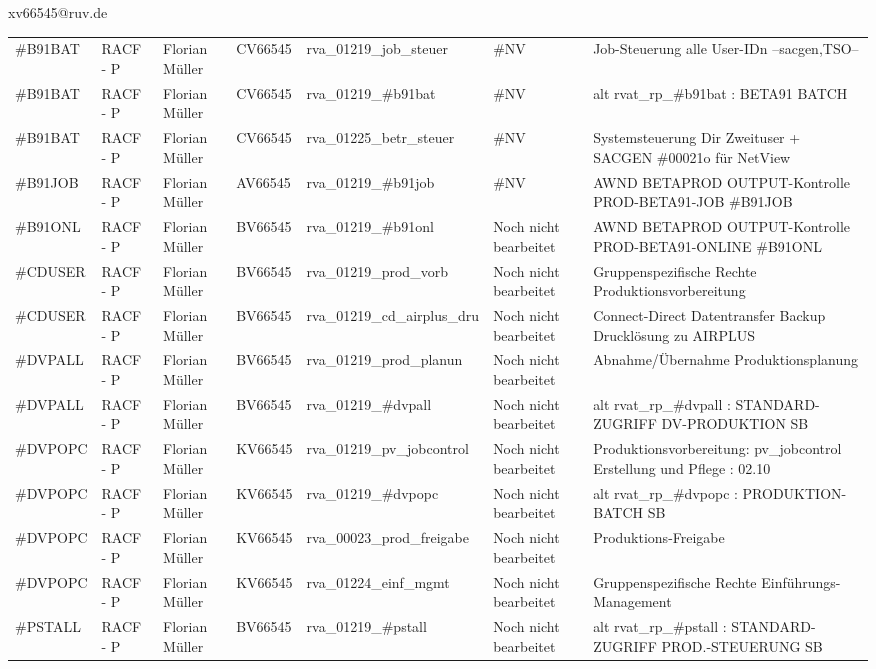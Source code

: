\documentclass[a4paper,landscape,12pt]{letter}
\begin{document}
\begin{letter}{xv66545@ruv.de\hfill \break}
\begin{tiny}
\begin{longtable}{|p{35mm}|p{15mm}|p{25mm}|p{10mm}|p{40mm}|p{50mm}|p{50mm}|}
\#B91BAT & RACF - P & Florian Müller & CV66545 & rva\_01219\_job\_steuer & \#NV & Job-Steuerung alle User-IDn --sacgen,TSO-- \\
\#B91BAT & RACF - P & Florian Müller & CV66545 & rva\_01219\_\#b91bat & \#NV & alt rvat\_rp\_\#b91bat          : BETA91 BATCH \\
\#B91BAT & RACF - P & Florian Müller & CV66545 & rva\_01225\_betr\_steuer & \#NV & Systemsteuerung Dir Zweituser + SACGEN \#00021o für NetView \\
\#B91JOB & RACF - P & Florian Müller & AV66545 & rva\_01219\_\#b91job & \#NV & AWND BETAPROD OUTPUT-Kontrolle PROD-BETA91-JOB \#B91JOB \\
\#B91ONL & RACF - P & Florian Müller & BV66545 & rva\_01219\_\#b91onl & Noch nicht bearbeitet & AWND BETAPROD OUTPUT-Kontrolle PROD-BETA91-ONLINE \#B91ONL \\
\#CDUSER & RACF - P & Florian Müller & BV66545 & rva\_01219\_prod\_vorb & Noch nicht bearbeitet & Gruppenspezifische Rechte Produktionsvorbereitung \\
\#CDUSER & RACF - P & Florian Müller & BV66545 & rva\_01219\_cd\_airplus\_dru & Noch nicht bearbeitet & Connect-Direct Datentransfer Backup Drucklösung zu AIRPLUS \\
\#DVPALL & RACF - P & Florian Müller & BV66545 & rva\_01219\_prod\_planun & Noch nicht bearbeitet & Abnahme/Übernahme Produktionsplanung \\
\#DVPALL & RACF - P & Florian Müller & BV66545 & rva\_01219\_\#dvpall & Noch nicht bearbeitet & alt rvat\_rp\_\#dvpall          : STANDARD-ZUGRIFF DV-PRODUKTION SB \\
\#DVPOPC & RACF - P & Florian Müller & KV66545 & rva\_01219\_pv\_jobcontrol & Noch nicht bearbeitet & Produktionsvorbereitung: pv\_jobcontrol Erstellung und Pflege : 02.10 \\
\#DVPOPC & RACF - P & Florian Müller & KV66545 & rva\_01219\_\#dvpopc & Noch nicht bearbeitet & alt rvat\_rp\_\#dvpopc          : PRODUKTION-BATCH SB \\
\#DVPOPC & RACF - P & Florian Müller & KV66545 & rva\_00023\_prod\_freigabe & Noch nicht bearbeitet & Produktions-Freigabe \\
\#DVPOPC & RACF - P & Florian Müller & KV66545 & rva\_01224\_einf\_mgmt & Noch nicht bearbeitet & Gruppenspezifische Rechte Einführungs-Management \\
\#PSTALL & RACF - P & Florian Müller & BV66545 & rva\_01219\_\#pstall & Noch nicht bearbeitet & alt rvat\_rp\_\#pstall          : STANDARD-ZUGRIFF PROD.-STEUERUNG SB \\

\end{longtable}
\end{tiny}
\end{letter}
\end{document}
